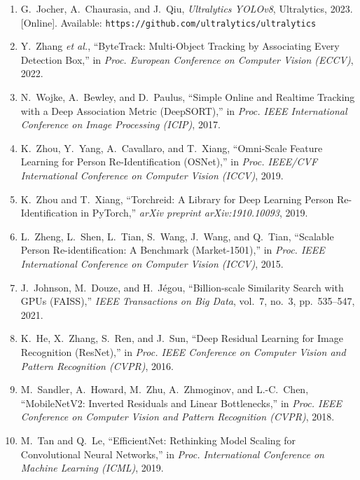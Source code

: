 \documentclass[12pt]{report}
\begin{document}
\begin{enumerate}
    \item G.~Jocher, A.~Chaurasia, and J.~Qiu, \textit{Ultralytics YOLOv8}, Ultralytics, 2023. [Online]. Available: \texttt{https://github.com/ultralytics/ultralytics}

    \item Y.~Zhang \textit{et al.}, ``ByteTrack: Multi-Object Tracking by Associating Every Detection Box,'' in \textit{Proc. European Conference on Computer Vision (ECCV)}, 2022.

    \item N.~Wojke, A.~Bewley, and D.~Paulus, ``Simple Online and Realtime Tracking with a Deep Association Metric (DeepSORT),'' in \textit{Proc. IEEE International Conference on Image Processing (ICIP)}, 2017.

    \item K.~Zhou, Y.~Yang, A.~Cavallaro, and T.~Xiang, ``Omni-Scale Feature Learning for Person Re-Identification (OSNet),'' in \textit{Proc. IEEE/CVF International Conference on Computer Vision (ICCV)}, 2019.

    \item K.~Zhou and T.~Xiang, ``Torchreid: A Library for Deep Learning Person Re-Identification in PyTorch,'' \textit{arXiv preprint arXiv:1910.10093}, 2019.

    \item L.~Zheng, L.~Shen, L.~Tian, S.~Wang, J.~Wang, and Q.~Tian, ``Scalable Person Re-identification: A Benchmark (Market-1501),'' in \textit{Proc. IEEE International Conference on Computer Vision (ICCV)}, 2015.

    \item J.~Johnson, M.~Douze, and H.~J\'egou, ``Billion-scale Similarity Search with GPUs (FAISS),'' \textit{IEEE Transactions on Big Data}, vol.~7, no.~3, pp.~535--547, 2021.

    \item K.~He, X.~Zhang, S.~Ren, and J.~Sun, ``Deep Residual Learning for Image Recognition (ResNet),'' in \textit{Proc. IEEE Conference on Computer Vision and Pattern Recognition (CVPR)}, 2016.

    \item M.~Sandler, A.~Howard, M.~Zhu, A.~Zhmoginov, and L.-C.~Chen, ``MobileNetV2: Inverted Residuals and Linear Bottlenecks,'' in \textit{Proc. IEEE Conference on Computer Vision and Pattern Recognition (CVPR)}, 2018.

    \item M.~Tan and Q.~Le, ``EfficientNet: Rethinking Model Scaling for Convolutional Neural Networks,'' in \textit{Proc. International Conference on Machine Learning (ICML)}, 2019.


\end{enumerate}
\end{document}
